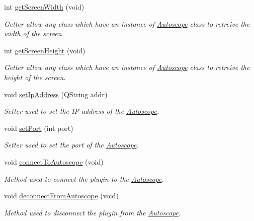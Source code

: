 \begin{DoxyCompactItemize}
int \mbox{\hyperlink{class_autoscope_a0e438a40043c916a7f0f98a30221de11}{get\+Screen\+Width}} (void)
\begin{DoxyCompactList}\small\item\em Getter allow any class which have an instance of \mbox{\hyperlink{class_autoscope}{Autoscope}} class to retreive the width of the screen. \end{DoxyCompactList}\item 
int \mbox{\hyperlink{class_autoscope_adb579d1e5a23aaa401d5a93be033529d}{get\+Screen\+Height}} (void)
\begin{DoxyCompactList}\small\item\em Getter allow any class which have an instance of \mbox{\hyperlink{class_autoscope}{Autoscope}} class to retreive the height of the screen. \end{DoxyCompactList}\item 
void \mbox{\hyperlink{class_autoscope_aad5b62b7a114ef8755923067e14f9dd8}{set\+Ip\+Address}} (Q\+String addr)
\begin{DoxyCompactList}\small\item\em Setter used to set the IP address of the \mbox{\hyperlink{class_autoscope}{Autoscope}}. \end{DoxyCompactList}\item 
void \mbox{\hyperlink{class_autoscope_acda88ddee4fb3fbd0333717c0f140e54}{set\+Port}} (int port)
\begin{DoxyCompactList}\small\item\em Setter used to set the port of the \mbox{\hyperlink{class_autoscope}{Autoscope}}. \end{DoxyCompactList}\item 
void \mbox{\hyperlink{class_autoscope_a1ae78f4cada1c4e36f5a06db126017fe}{connect\+To\+Autoscope}} (void)
\begin{DoxyCompactList}\small\item\em Method used to connect the plugin to the \mbox{\hyperlink{class_autoscope}{Autoscope}}. \end{DoxyCompactList}\item 
void \mbox{\hyperlink{class_autoscope_aafe64e11135903a1b83d16ffdd07d63e}{deconnect\+From\+Autoscope}} (void)
\begin{DoxyCompactList}\small\item\em Method used to disconnect the plugin from the \mbox{\hyperlink{class_autoscope}{Autoscope}}. \end{DoxyCompactList}\end{DoxyCompactItemize}
